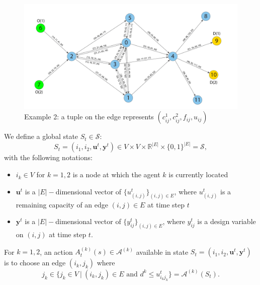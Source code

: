 \label{Example2}
\begin{figure}[hbt!]
    \centering
    \captionsetup{justification=centering}
    \includegraphics[width=\textwidth]{figures/Reinforcement/Example2.pdf}
    \caption{Example 2: a tuple on the edge represents $(c_{ij}^1, c_{ij}^2, f_{ij}, u_{ij})$}
    \label{fig:Example2}
\end{figure}
\clearpage

We define a global state $S_t \in \mathcal{S}$: $$S_t = (i_1, i_2, \boldsymbol{u}^t, \boldsymbol{y}^t) \in V \times V \times \mathbb{R}^{|E|} \times \{0,1\}^{|E|} = \mathcal{S},$$ with the following notations:
\begin{itemize}
    \item $i_k \in V$ for $k = 1,2$ is a node at which the agent $k$ is currently located
    \item $\boldsymbol{u}^t$ is a $|E|-$dimensional vector of $\{u_{(i,j)}^t\}_{(i,j)\in E}$, where $u_{(i,j)}^t$ is a remaining capacity of an edge $(i,j) \in E$ at time step $t$
    \item $\boldsymbol{y}^t$ is a $|E|-$dimensional vector of $\{y_{ij}^t\}_{(i,j)\in E}$, where $y_{ij}^t$ is a design variable on $(i,j)$ at time step $t$.
\end{itemize}

For $k = 1,2$, an action $A_t^{(k)}(s) \in \mathcal{A}^{(k)}$ available in state $S_t = (i_1, i_2, \boldsymbol{u}^t, \boldsymbol{y}^t)$ is to choose an edge $(i_k, j_k)$ where $$j_k \in \{j_k \in V \ | \ (i_k, j_k) \in E \text{ and } d^k \leq u^t_{i_k j_k}\} = \mathcal{A}^{(k)}(S_t).$$


